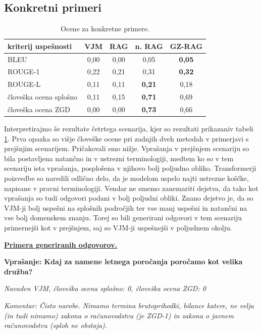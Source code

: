\documentclass[a4paper,12pt,openright]{book}
\begin{document}
\subsection{Konkretni primeri}

\begin{table}[H]
	\centering
	\caption{Ocene za konkretne primere.}
	\begin{tabular}{|l|c|c|c|c|}
		\hline
		kriterij uspešnosti    & VJM  & RAG  & n. RAG        & GZ-RAG        \\ \hline
		BLEU                   & 0,00 & 0,00 & 0,05          & \textbf{0,05} \\ \hline
		ROUGE-1                & 0,22 & 0,21 & 0,31          & \textbf{0,32} \\ \hline
		ROUGE-L                & 0,11 & 0,11 & \textbf{0,21} & 0,18          \\ \hline
		človeška ocena splošno & 0,11 & 0,15 & \textbf{0,71} & 0,69          \\ \hline
		človeška ocena ZGD     & 0,00 & 0,00 & \textbf{0,73} & 0,66          \\ \hline
	\end{tabular}
	\label{rez4}
\end{table}

Interpretirajmo še rezultate četrtega scenarija, kjer so rezultati prikazaniv tabeli \ref{rez4}. Prva opazka so višje človeške ocene pri zadnjih dveh metodah v primerjavi s prejšnjim scenarijem. Pričakovali smo nižje. Vprašanja v prejšnjem scenariju so bila postavljena natančno in v ustrezni terminologiji, medtem ko so v tem scenariju ista vprašanja, posplošena v njihovo bolj poljudno obliko. Transformerji poizvedbe so naredili odlično delo, da je modelom uspelo najti ustrezne koščke, napisane v pravni terminologiji. Vendar ne smemo zanemariti dejstva, da tako kot vprašanja so tudi odgovori podani v bolj poljudni obliki. Znano dejstvo je, da so VJM-ji bolj uspešni na splošnih področjih ter vse manj uspešni in natančni na vse bolj domenskem znanju. Torej so bili generirani odgovori v tem scenariju primernejši kot v prejšnjem, saj so VJM-ji uspešnejši v poljudnem okolju.

\underline{\textbf{Primera generiranih odgovorov.}}

\textbf{Vprašanje: Kdaj za namene letnega poročanja poročamo kot velika družba?}

\textit{Navaden VJM, človeška ocena splošno: 0, človeška ocena ZGD: 0}

\textit{Komentar: Čisto narobe. Nimamo termina brutoprihodki, bilance katere, ne velja (in tudi nimamo) zakona o računovodstvu (je ZGD-1) in zakona o javnem računovodstvu (sploh ne obstaja).}
\end{document}
